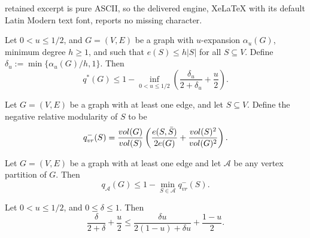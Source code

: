 \documentclass[10pt,a4paper]{amsart}
\newcommand{\vol}{{\rm vol}}
\begin{document}
retained excerpt is pure ASCII, so the delivered engine, XeLaTeX with its default Latin Modern text font, reports no missing character.
\begin{theorem}\label{thm:general_upper_bound_mod_2}
Let $0<u\leq 1/2$, and $G=(V,E)$ be a graph with $u$-expansion $\alpha_u(G)$, minimum degree $h \geq 1$, and such that $e(S) \leq h |S|$ for all $S \subseteq V$. 
Define   
$\delta_u:= \min\{\alpha_u(G)/h,1\}$. Then
	\[
	q^*(G) \leq 1- \inf_{0 < u \leq 1/2} \left(\frac{\delta_u}{2+\delta_u} + \frac{u}{2}\right).
	\]
\end{theorem}

\begin{definition}\label{defn.neg_mod}
	Let $G=(V,E)$ be a graph with at least one edge, and let $S \subseteq V$.	Define the negative relative modularity of $S$ to be 
	\[
	q_{vr}^{-}(S) = \frac{\vol(G)}{\vol(S)}\left(\frac{ e(S,\bar{S})}{2e(G)}+\frac{\vol(S)^2}{\vol(G)^2}\right). 
	\]
\end{definition}

\begin{proposition} \label{prop.bound_by_worst_set_vertex}
	Let $G=(V,E)$ be a graph with at least one edge and let $\mathcal{A}$ be any vertex partition of $G$. Then
    \[
		q_{\mathcal{A}}(G) \leq 1 - \min_{S \in \mathcal{A}} q_{vr}^{-}(S).
	\]
\end{proposition}

\begin{lemma}\label{lem:dull}
	Let $0 <  u \leq 1/2$, and $0 \leq \delta \leq 1$. Then
	\[ \frac{\delta}{2+\delta} + \frac{u}{2} \leq \frac{\delta u}{2(1-u) +\delta u} + \frac{1-u}{2}.\]
\end{lemma}
\end{document}
